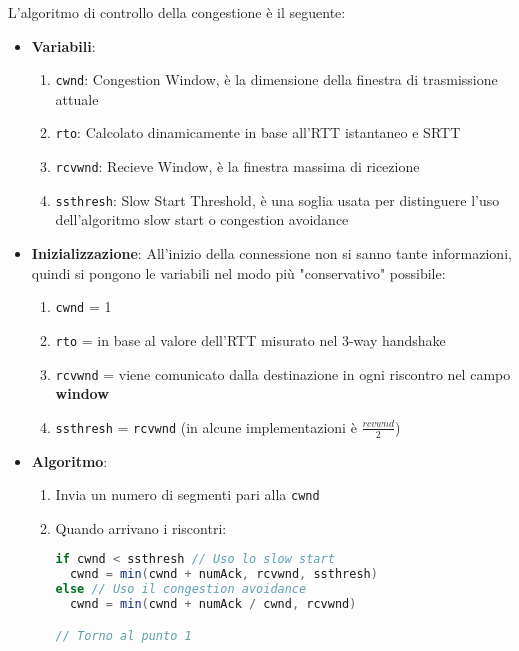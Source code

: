 \documentclass[a4paper]{article}
\begin{document}
\noindent
L'algoritmo di controllo della congestione è il seguente:
\begin{itemize}
  \item \textbf{Variabili}:
    \begin{enumerate}
      \item \texttt{cwnd}: Congestion Window, è la dimensione della finestra di
        trasmissione attuale
      \item \texttt{rto}: Calcolato dinamicamente in base all'RTT istantaneo e SRTT
      \item \texttt{rcvwnd}: Recieve Window, è la finestra massima di ricezione
      \item \texttt{ssthresh}: Slow Start Threshold, è una soglia usata per distinguere
        l'uso dell'algoritmo slow start o congestion avoidance
    \end{enumerate}

  \item \textbf{Inizializzazione}: All'inizio della connessione non si sanno tante
    informazioni, quindi si pongono le variabili nel modo più "conservativo" possibile:
    \begin{enumerate}
      \item \texttt{cwnd} = 1
      \item \texttt{rto} = in base al valore dell'RTT misurato nel 3-way handshake
      \item \texttt{rcvwnd} = viene comunicato dalla destinazione in ogni riscontro
        nel campo \textbf{window}
      \item \texttt{ssthresh} = \texttt{rcvwnd} (in alcune implementazioni è 
        \( \frac{rcvwnd}{2} \))
    \end{enumerate}

  \item \textbf{Algoritmo}:
    \begin{enumerate}
      \item Invia un numero di segmenti pari alla \texttt{cwnd}
      \item Quando arrivano i riscontri:
        \begin{lstlisting}[language=Scala]
if cwnd < ssthresh // Uso lo slow start
  cwnd = min(cwnd + numAck, rcvwnd, ssthresh)
else // Uso il congestion avoidance
  cwnd = min(cwnd + numAck / cwnd, rcvwnd)

// Torno al punto 1
        \end{lstlisting}


\end{enumerate}
\end{itemize}
\end{document}
